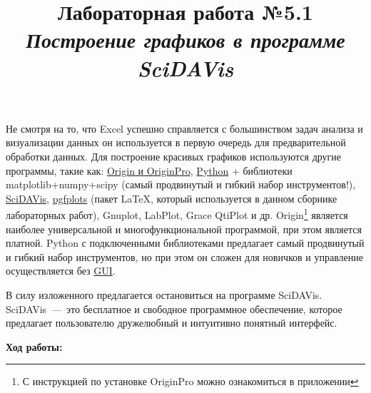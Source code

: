 \documentclass[14pt,a4paper]{article}
\title{Лабораторная работа №5.1 \\ \textit{Построение графиков в программе SciDAVis}}
\begin{document}
\maketitle
Не смотря на то, что Excel успешно справляется с большинством задач анализа и визуализации данных он используется в первую очередь для предварительной обработки данных. Для построение красивых графиков используются другие программы, такие как: \href{https://www.originlab.com/index.aspx?go=Products/Origin}{Origin и OriginPro}, \href{https://www.python.org/}{Python} + библиотеки matplotlib+numpy+scipy (самый продвинутый и гибкий набор инструментов!), \href{https://scidavis.sourceforge.net/}{SciDAVis}, \href{https://www.ctan.org/pkg/pgfplots}{pgfplots} (пакет \LaTeX, который используется в данном сборнике лабораторных работ), Gnuplot, LabPlot, Grace QtiPlot и др. Origin\footnote{С инструкцией по установке OriginPro можно ознакомиться в приложении} является наиболее универсальной и многофункциональной программой, при этом является платной. Python с подключенными библиотеками предлагает самый продвинутый и гибкий набор инструментов, но при этом он сложен для новичков и управление осуществляется без \href{https://ru.wikipedia.org/wiki/%D0%93%D1%80%D0%B0%D1%84%D0%B8%D1%87%D0%B5%D1%81%D0%BA%D0%B8%D0%B9_%D0%B8%D0%BD%D1%82%D0%B5%D1%80%D1%84%D0%B5%D0%B9%D1%81_%D0%BF%D0%BE%D0%BB%D1%8C%D0%B7%D0%BE%D0%B2%D0%B0%D1%82%D0%B5%D0%BB%D1%8F}{GUI}.

В силу изложенного предлагается остановиться на программе SciDAVis. SciDAVis~---~это бесплатное и свободное программное обеспечение, которое предлагает пользователю дружелюбный и интуитивно понятный интерфейс. 

\begin{center}
    \textbf{Ход работы:}
\end{center}
\end{document}
